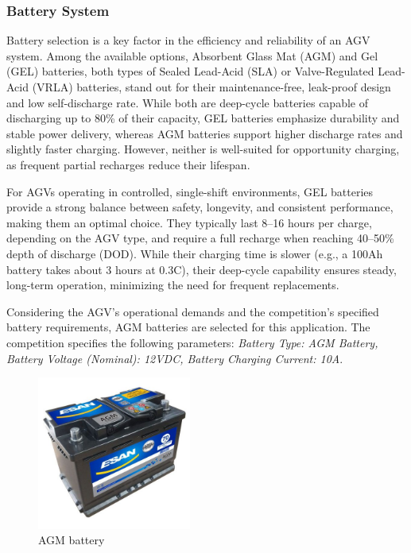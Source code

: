 \documentclass[../../main]{subfiles}
\begin{document}
\subsubsection{Battery System}

Battery selection is a key factor in the efficiency and reliability of an AGV system. 
Among the available options, Absorbent Glass Mat (AGM) and Gel (GEL) batteries, 
both types of Sealed Lead-Acid (SLA) or Valve-Regulated Lead-Acid (VRLA) batteries, 
stand out for their maintenance-free, leak-proof design and low self-discharge rate. 
While both are deep-cycle batteries capable of discharging up to 80\% of their capacity, 
GEL batteries emphasize durability and stable power delivery, whereas AGM batteries 
support higher discharge rates and slightly faster charging. 
However, neither is well-suited for opportunity charging, as frequent partial recharges reduce their lifespan.

For AGVs operating in controlled, single-shift environments, 
GEL batteries provide a strong balance between safety, longevity, and consistent performance, 
making them an optimal choice. They typically last 8--16 hours per charge, depending on the AGV type, 
and require a full recharge when reaching 40--50\% depth of discharge (DOD). 
While their charging time is slower (e.g., a 100Ah battery takes about 3 hours at 0.3C), 
their deep-cycle capability ensures steady, long-term operation, minimizing the need for frequent replacements.

Considering the AGV’s operational demands and the competition's specified battery requirements, 
AGM batteries are selected for this application. The competition specifies the following parameters: 
\textit{Battery Type: AGM Battery, Battery Voltage (Nominal): 12VDC, Battery Charging Current: 10A}.

\begin{figure}[H]
    \centering
\includegraphics[width=0.45\textwidth]{fig/battery.jpg}
\caption{AGM battery}
\label{AGM battery} %
\end{figure}
\end{document}
